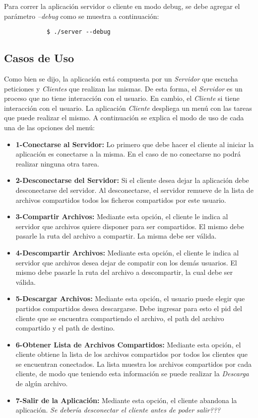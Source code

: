 \documentclass[a4paper,10pt]{article}
\begin{document}
		Para correr la aplicaci\'on servidor o cliente en modo debug, se debe agregar el par\'ametro \emph{--debug} como se muestra a continuaci\'on:
		\begin{verbatim}
			$ ./server --debug
		\end{verbatim}

		\subsection{Casos de Uso}

			Como bien se dijo, la aplicaci\'on est\'a compuesta por un \emph{Servidor} que escucha peticiones y \emph{Clientes} que realizan las mismas. 
			De esta forma, el \emph{Servidor} es un proceso que no tiene interacci\'on con el usuario. En cambio, el \emph{Cliente} si tiene interacci\'on
			con el usuario. La aplicaci\'on \emph{Cliente} despliega un men\'u con las tareas que puede realizar el mismo. A continuaci\'on se 
			explica el modo de uso de cada una de las opciones del men\'u: 

			\begin{itemize}
				\item \textbf{1-Conectarse al Servidor:} Lo primero que debe hacer el cliente al iniciar la aplicaci\'on es conectarse a la misma. En el caso
				de no conectarse no podr\'a realizar ninguna otra tarea.
				\item \textbf{2-Desconectarse del Servidor:} Si el cliente desea dejar la aplicaci\'on debe desconectarse del servidor. Al desconectarse, el
				servidor remueve de la lista de archivos compartidos todos los ficheros compartidos por este usuario.
				\item \textbf{3-Compartir Archivos:} Mediante esta opci\'on, el cliente le indica al servidor que archivos quiere disponer para ser compartidos.
				El mismo debe pasarle la ruta del archivo a compartir. La misma debe ser v\'alida.
				\item \textbf{4-Descompartir Archivos:} Mediante esta opci\'on, el cliente le indica al servidor que archivos desea dejar de compatir con los 
				dem\'as usuarios. El mismo debe pasarle la ruta del archivo a descompartir, la cual debe ser v\'alida.
				\item \textbf{5-Descargar Archivos:} Mediante esta opci\'on, el usuario puede elegir que partidos compartidos desea descargarse. Debe ingresar
				para esto el pid del cliente que se encuentra compartiendo el archivo, el path del archivo compartido y el path de destino.
				\item \textbf{6-Obtener Lista de Archivos Compartidos:} Mediante esta opci\'on, el cliente obtiene la lista de los archivos compartidos por 
				todos los clientes que se encuentran conectados. La lista muestra los archivos compartidos por cada cliente, de modo que teniendo esta 
				informaci\'on se puede realizar la \emph{Descarga} de alg\'un archivo.
				\item \textbf{7-Salir de la Aplicaci\'on:} Mediante esta opci\'on, el cliente abandona la aplicaci\'on. \emph{Se deber\'ia desconectar el cliente
				antes de poder salir???}
			\end{itemize}
\end{document}
